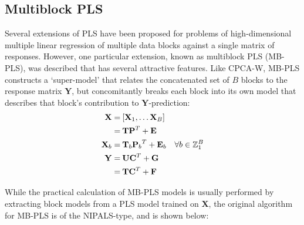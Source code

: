 \subsection{Multiblock PLS}

\begin{doublespace}
Several extensions of PLS \cite{westerhuis:jchemo1998} have been proposed for
problems of high-dimensional multiple linear regression of multiple data
blocks against a single matrix of responses. However, one particular extension,
known as multiblock PLS (MB-PLS), was described \cite{westerhuis:jchemo1997}
that has several attractive features. Like CPCA-W, MB-PLS constructs a
`super-model' that relates the concatenated set of $B$ blocks to the response
matrix $\mathbf{Y}$, but concomitantly breaks each block into its own model
that describes that block's contribution to $\mathbf{Y}$-prediction:
\begin{align}
\mathbf{X} =& \: [\mathbf{X}_1, \dots \mathbf{X}_B] \\
           =& \: \mathbf{T} \mathbf{P}^T + \mathbf{E} \\
\mathbf{X}_b =& \: \mathbf{T}_b {\mathbf{P}_b}^T + \mathbf{E}_b
 \quad \forall b \in \mathbb{Z}_{1}^{B} \\
\mathbf{Y} =& \: \mathbf{U} \mathbf{C}^T + \mathbf{G} \\
           =& \: \mathbf{T} \mathbf{C}^T + \mathbf{F} \nonumber
\end{align}

While the practical calculation of MB-PLS models is usually performed by
extracting block models from a PLS model trained on $\mathbf{X}$, the
original algorithm for MB-PLS is of the NIPALS-type, and is shown below:
\end{doublespace}

